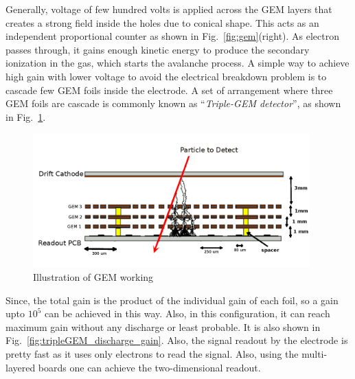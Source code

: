 Generally, voltage of few hundred volts is applied across the GEM layers that creates a strong field inside the holes due to conical shape. 
This acts as an independent proportional counter as shown in Fig.~\ref{fig:gem}(right). As electron passes through, it gains enough kinetic energy to produce the secondary ionization in the gas, which starts the avalanche process. 
A simple way to achieve high gain with lower voltage to avoid the electrical breakdown problem is to cascade few GEM foils inside the electrode. 
A set of arrangement where three GEM foils are cascade is commonly known as ``\textit{Triple-GEM detector}'', as shown in Fig.~\ref{fig:gemgaps}.
\begin{figure}[!htbp]
    \begin{center}
        \includegraphics[width=0.95\textwidth]{figures/GEM/triple_gem.png}
        \caption{Illustration of GEM working}
        \label{fig:gemgaps}
    \end{center}
\end{figure} 
Since, the total gain is the product of the individual gain of each foil, so a gain upto $10^5$ can be achieved in this way.
Also, in this configuration, it can reach maximum gain without any discharge or least probable. It is also shown in Fig.~\ref{fig:tripleGEM_discharge_gain}. 
Also, the signal readout by the electrode is pretty fast as it uses only electrons to read the signal. 
Also, using the multi-layered boards one can achieve the two-dimensional readout.
